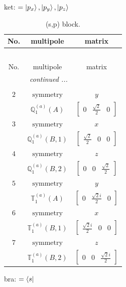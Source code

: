 \documentclass[fleqn,8pt,landscape]{jsarticle}
\begin{document}
\noindent
ket: $=\ket{p_{x}}, \ket{p_{y}}, \ket{p_{z}}$
\renewcommand{\arraystretch}{1.6}
\begin{longtable}{ccc}
\caption{(s,p) block.}
 \\
 \hline \hline
No. & multipole & matrix \\ \hline \endfirsthead

\multicolumn{2}{l}{\tablename\ \thetable{}} \\
 \hline \hline
No. & multipole & matrix \\ \hline \endhead

 \hline \hline
\multicolumn{2}{r}{\footnotesize\it continued ...} \\ \endfoot

 \hline \hline
\multicolumn{2}{r}{} \\ \endlastfoot

$ 2 $ & $ \text{symmetry} $ & $ y $ \\
$  $ & $ \mathbb{Q}_{1}^{(a)}(A) $ & $ \begin{bmatrix} 0 & \frac{\sqrt{2}}{2} & 0 \end{bmatrix} $ \\ \hline
$ 3 $ & $ \text{symmetry} $ & $ x $ \\
$  $ & $ \mathbb{Q}_{1}^{(a)}(B,1) $ & $ \begin{bmatrix} \frac{\sqrt{2}}{2} & 0 & 0 \end{bmatrix} $ \\ \hline
$ 4 $ & $ \text{symmetry} $ & $ z $ \\
$  $ & $ \mathbb{Q}_{1}^{(a)}(B,2) $ & $ \begin{bmatrix} 0 & 0 & \frac{\sqrt{2}}{2} \end{bmatrix} $ \\ \hline
$ 5 $ & $ \text{symmetry} $ & $ y $ \\
$  $ & $ \mathbb{T}_{1}^{(a)}(A) $ & $ \begin{bmatrix} 0 & \frac{\sqrt{2} i}{2} & 0 \end{bmatrix} $ \\ \hline
$ 6 $ & $ \text{symmetry} $ & $ x $ \\
$  $ & $ \mathbb{T}_{1}^{(a)}(B,1) $ & $ \begin{bmatrix} \frac{\sqrt{2} i}{2} & 0 & 0 \end{bmatrix} $ \\ \hline
$ 7 $ & $ \text{symmetry} $ & $ z $ \\
$  $ & $ \mathbb{T}_{1}^{(a)}(B,2) $ & $ \begin{bmatrix} 0 & 0 & \frac{\sqrt{2} i}{2} \end{bmatrix} $ \\ \hline
\end{longtable}
bra: $=\bra{s}$
\end{document}
